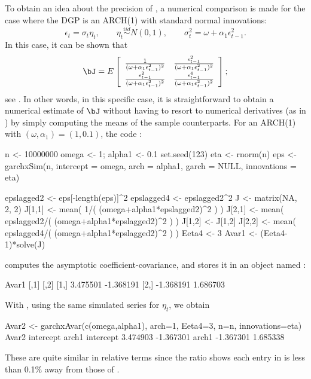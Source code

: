 To obtain an idea about the precision of , a numerical comparison is made for the case where the DGP is an ARCH(1) with standard normal innovations:
%
\begin{equation}
	\epsilon_t = \sigma_t\eta_t, \qquad \eta_t \overset{iid}{\sim} N(0,1), \qquad  \sigma_t^2 = \omega + \alpha_1\epsilon_{t-1}^2.
\end{equation}
%
In this case, it can be shown that
%
\begin{equation}
	\bJ = E \left[
		\begin{array}{cc}
			\frac{1}{(\omega + \alpha_1\epsilon_{t-1}^2)^2} & \frac{\epsilon_{t-1}^2}{(\omega + \alpha_1\epsilon_{t-1}^2)^2} \\
			\frac{\epsilon_{t-1}^2}{(\omega + \alpha_1\epsilon_{t-1}^2)^2} & \frac{\epsilon_{t-1}^4}{(\omega + \alpha_1\epsilon_{t-1}^2)^2} \\
		\end{array}
	\right];
\end{equation}
%
see \cite[][pp. 180-181]{FrancqZakoian2019}. In other words, in this specific case, it is straightforward to obtain a numerical estimate of $\bJ$ without having to resort to numerical derivatives (as in ) by simply computing the means of the sample counterparts. For an ARCH(1) with $(\omega,\alpha_1)=(1,0.1)$, the code :
%
\begin{example}
	n <- 10000000
	omega <- 1; alpha1 <- 0.1
	set.seed(123)
	eta <- rnorm(n)
	eps <- garchxSim(n, intercept = omega, arch = alpha1, garch = NULL,
		innovations = eta)

	epslagged2 <- eps[-length(eps)]^2
	epslagged4 <- epslagged2^2
	J <- matrix(NA, 2, 2)
	J[1,1] <- mean( 1/( (omega+alpha1*epslagged2)^2 ) )
	J[2,1] <- mean( epslagged2/( (omega+alpha1*epslagged2)^2 ) )
	J[1,2] <- J[1,2]
	J[2,2] <- mean( epslagged4/( (omega+alpha1*epslagged2)^2 ) )
	Eeta4 <- 3
	Avar1 <- (Eeta4-1)*solve(J)
\end{example}
%
computes the asymptotic coefficient-covariance, and stores it in an object named :
%
\begin{example}
	Avar1
	          [,1]      [,2]
	[1,]  3.475501 -1.368191
	[2,] -1.368191  1.686703
\end{example}
%
With , using the same simulated series for $\eta_t$, we obtain
%
\begin{example}
	Avar2 <- garchxAvar(c(omega,alpha1), arch=1, Eeta4=3, n=n, innovations=eta)
	Avar2
	          intercept     arch1
	intercept  3.474903 -1.367301
	arch1     -1.367301  1.685338
\end{example}
%
These are quite similar in relative terms since the ratio  shows each entry in  is less than 0.1\% away from those of .

